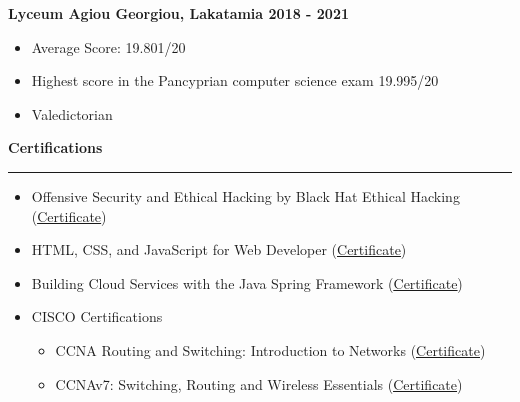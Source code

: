 \documentclass[12pt]{article}
\begin{document}
\begin{paracol}{2}
{      }
      \vspace{0.5cm}
      \textbf{\textcolor{bgcolor}{Lyceum Agiou Georgiou, Lakatamia \hfill 2018 - 2021}}\\[0.5em]
      {\renewcommand{\labelitemi}{\textcolor{bgcolor}{\normalsize$\bullet$}}%
      \begin{itemize}[leftmargin=33pt, itemsep=0pt, topsep=0pt]
            \item Average Score: 19.801/20
            \item Highest score in the Pancyprian computer science exam 19.995/20
            \item Valedictorian
         \end{itemize}
      }
\end{paracol}
\newpage
{}
{\fontsize{14pt}{13pt}\selectfont
   \textbf{\textcolor{bgcolor}{Certifications}}\\[0.3em]
}
\hrule
\vspace{0.5cm}
{\renewcommand{\labelitemi}{\textcolor{bgcolor}{\normalsize$\bullet$}}%
   \begin{itemize}[leftmargin=13pt, itemsep=0pt, topsep=0pt]
      \item Offensive Security and Ethical Hacking by Black Hat Ethical Hacking (\href{https://giorgospaphitis.com/resources/pdfs/Offensive_Security_Ethical_Hacking_Course_Certificate_Giorgos_Paphitis.pdf}{\underline{Certificate}})\\
      \item HTML, CSS, and JavaScript for Web Developer (\href{https://www.coursera.org/account/accomplishments/verify/F7P88FB4ZCZ9?utm_source=ln&utm_medium=certificate&utm_content=cert_image&utm_campaign=sharing_cta&utm_product=course}{\underline{Certificate}})\\
      \item Building Cloud Services with the Java Spring Framework (\href{https://www.coursera.org/account/accomplishments/verify/QMED2F9XQBMH?utm_source=link&utm_medium=certificate&utm_content=cert_image&utm_campaign=sharing_cta&utm_product=course}{\underline{Certificate}})\\
      \item CISCO Certifications\\
      \begin{itemize}[leftmargin=20pt, itemsep=0pt, topsep=-3pt,partopsep=0pt]
         \item CCNA Routing and Switching: Introduction to Networks (\href{https://giorgospaphitis.com/resources/pdfs/Giorgos_Paphitis_CCNA_Intro.pdf}{\underline{Certificate}})\\
         \item CCNAv7: Switching, Routing and Wireless Essentials (\href{https://giorgospaphitis.com/resources/pdfs/Giorgos_Paphitis_CCNA_7.pdf}{\underline{Certificate}})\\
      \end{itemize}
   \end{itemize}
}
\end{document}
